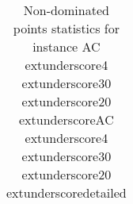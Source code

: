\begin{table}
\caption{Non-dominated points statistics for instance AC	extunderscore4	extunderscore30	extunderscore20	extunderscoreAC	extunderscore4	extunderscore30	extunderscore20	extunderscoredetailed}
\label{tab:stats/AC_4_30_20_AC_4_30_20_detailed}
\begin{tabular}{}
\toprule
\midrule
\bottomrule
\end{tabular}
\end{table}
